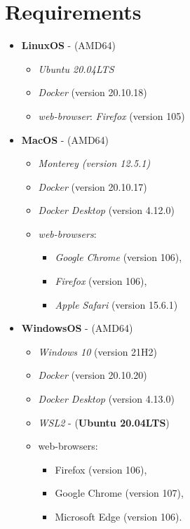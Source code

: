 \documentclass[
  a4paper,
  oneside,
  open=any]{scrreport}
\providecommand{\tightlist}{%
  \setlength{\itemsep}{0pt}\setlength{\parskip}{0pt}}\usepackage{longtable,booktabs,array}
\begin{document}
\hypertarget{requirements}{%
\section*{Requirements}\label{requirements}}


\begin{itemize}
\tightlist
\item
  \textbf{LinuxOS} - (AMD64)

  \begin{itemize}
  \tightlist
  \item
    \emph{Ubuntu 20.04LTS}
  \item
    \emph{Docker} (version 20.10.18)
  \item
    \emph{web-browser}: \emph{Firefox} (version 105)
  \end{itemize}
\item
  \textbf{MacOS} - (AMD64)

  \begin{itemize}
  \tightlist
  \item
    \emph{Monterey (version 12.5.1)}
  \item
    \emph{Docker} (version 20.10.17)
  \item
    \emph{Docker Desktop} (version 4.12.0)
  \item
    \emph{web-browsers}:

    \begin{itemize}
    \tightlist
    \item
      \emph{Google Chrome} (version 106),
    \item
      \emph{Firefox} (version 106),
    \item
      \emph{Apple Safari} (version 15.6.1)
    \end{itemize}
  \end{itemize}
\item
  \textbf{WindowsOS} - (AMD64)

  \begin{itemize}
  \tightlist
  \item
    \emph{Windows 10} (version 21H2)
  \item
    \emph{Docker} (version 20.10.20)
  \item
    \emph{Docker Desktop} (version 4.13.0)
  \item
    \emph{WSL2} - (\textbf{Ubuntu 20.04LTS})
  \item
    web-browsers:

    \begin{itemize}
    \tightlist
    \item
      Firefox (version 106),
    \item
      Google Chrome (version 107),
    \item
      Microsoft Edge (version 106).
    \end{itemize}
  \end{itemize}
\end{itemize}
\end{document}
